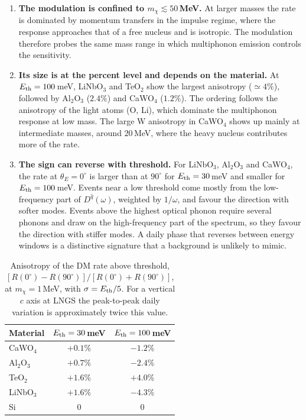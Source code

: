 \begin{enumerate}
  \item \textbf{The modulation is confined to $m_\chi \lesssim 50$\,MeV.}
  At larger masses the rate is dominated by momentum transfers in the impulse regime,
  where the response approaches that of a free nucleus and is isotropic. The modulation
  therefore probes the same mass range in which multiphonon emission controls the
  sensitivity.

  \item \textbf{Its size is at the percent level and depends on the material.}
  At $E_{\rm th}=100$\,meV, LiNbO$_3$ and TeO$_2$ show the largest anisotropy ($\simeq
  4\%$), followed by Al$_2$O$_3$ ($2.4\%$) and CaWO$_4$ ($1.2\%$). The ordering follows
  the anisotropy of the light atoms (O, Li), which dominate the multiphonon response at
  low mass. The large W anisotropy in CaWO$_4$ shows up mainly at intermediate masses,
  around $20$\,MeV, where the heavy nucleus contributes more of the rate.

  \item \textbf{The sign can reverse with threshold.}
  For LiNbO$_3$, Al$_2$O$_3$ and CaWO$_4$, the rate at $\theta_E=0^\circ$ is larger
  than at $90^\circ$ for $E_{\rm th}=30$\,meV and smaller for $E_{\rm th}=100$\,meV.
  Events near a low threshold come mostly from the low-frequency part of
  $D^{\hat q}(\omega)$, weighted by $1/\omega$, and favour the direction with softer
  modes. Events above the highest optical phonon require several phonons and draw on the
  high-frequency part of the spectrum, so they favour the direction with stiffer modes.
  A daily phase that reverses between energy windows is a distinctive signature that a
  background is unlikely to mimic.
\end{enumerate}

\begin{table}[t]
  \centering
  \caption{Anisotropy of the DM rate above threshold,
  $[R(0^\circ)-R(90^\circ)]/[R(0^\circ)+R(90^\circ)]$, at $m_\chi = 1$\,MeV, with
  $\sigma=E_{\rm th}/5$. For a vertical $c$ axis at LNGS the peak-to-peak daily
  variation is approximately twice this value.}
  \label{tab:directional}
  \begin{tabular}{lcc}
    \hline\hline
    Material & $E_{\rm th}=30$\,meV & $E_{\rm th}=100$\,meV \\
    \hline
    CaWO$_4$  & $+0.1\%$ & $-1.2\%$ \\
    Al$_2$O$_3$ & $+0.7\%$ & $-2.4\%$ \\
    TeO$_2$   & $+1.6\%$ & $+4.0\%$ \\
    LiNbO$_3$ & $+1.6\%$ & $-4.3\%$ \\
    Si        & $0$      & $0$      \\
    \hline\hline
  \end{tabular}
\end{table}

